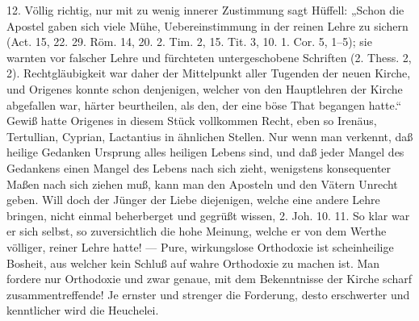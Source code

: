 12. Völlig richtig, nur mit zu wenig innerer Zustimmung sagt Hüffell: „Schon die Apostel gaben sich viele Mühe, Uebereinstimmung in der reinen Lehre zu sichern (Act. 15, 22. 29. Röm. 14, 20. 2. Tim. 2, 15. Tit. 3, 10. 1. Cor. 5, 1–5); sie warnten vor falscher Lehre und fürchteten untergeschobene Schriften (2. Thess. 2, 2). Rechtgläubigkeit war daher der Mittelpunkt aller Tugenden der neuen Kirche, und Origenes konnte schon denjenigen, welcher von den Hauptlehren der Kirche abgefallen war, härter beurtheilen, als den, der eine böse That begangen hatte.“ Gewiß hatte Origenes in diesem Stück vollkommen Recht, eben so Irenäus, Tertullian, Cyprian, Lactantius in ähnlichen Stellen. Nur wenn man verkennt,
daß heilige Gedanken Ursprung alles heiligen Lebens sind, und daß jeder Mangel des Gedankens einen Mangel des Lebens nach sich zieht, wenigstens konsequenter Maßen nach sich ziehen muß, kann man den Aposteln und den Vätern Unrecht geben. Will doch der Jünger der Liebe diejenigen, welche eine andere Lehre bringen, nicht einmal beherberget und gegrüßt wissen, 2. Joh. 10. 11. So klar war er sich selbst, so zuversichtlich die hohe Meinung, welche er von dem Werthe völliger, reiner Lehre hatte! — Pure, wirkungslose Orthodoxie ist scheinheilige Bosheit, aus welcher kein Schluß auf wahre Orthodoxie zu machen ist. Man fordere nur Orthodoxie und zwar genaue, mit dem Bekenntnisse der Kirche scharf zusammentreffende! Je ernster und strenger die Forderung, desto erschwerter und kenntlicher wird die Heuchelei.

